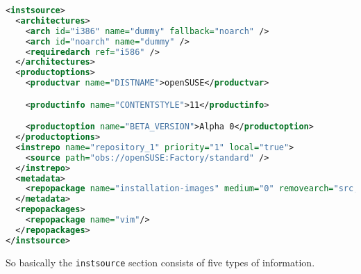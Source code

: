\begin{lstlisting}[language=xml, caption={Installation source extensions},
label={lst:configmin}]
<instsource>
  <architectures>
    <arch id="i386" name="dummy" fallback="noarch" />
    <arch id="noarch" name="dummy" />
    <requiredarch ref="i586" />
  </architectures>
  <productoptions>
    <productvar name="DISTNAME">openSUSE</productvar>

    <productinfo name="CONTENTSTYLE">11</productinfo>

    <productoption name="BETA_VERSION">Alpha 0</productoption>
  </productoptions>
  <instrepo name="repository_1" priority="1" local="true">
    <source path="obs://openSUSE:Factory/standard" />
  </instrepo>
  <metadata>
    <repopackage name="installation-images" medium="0" removearch="src,nosrc" onlyarch="i586," />
  </metadata>
  <repopackages>
    <repopackage name="vim"/>
  </repopackages>
</instsource>
\end{lstlisting}

So basically the \texttt{instsource} section consists of five types of information.

